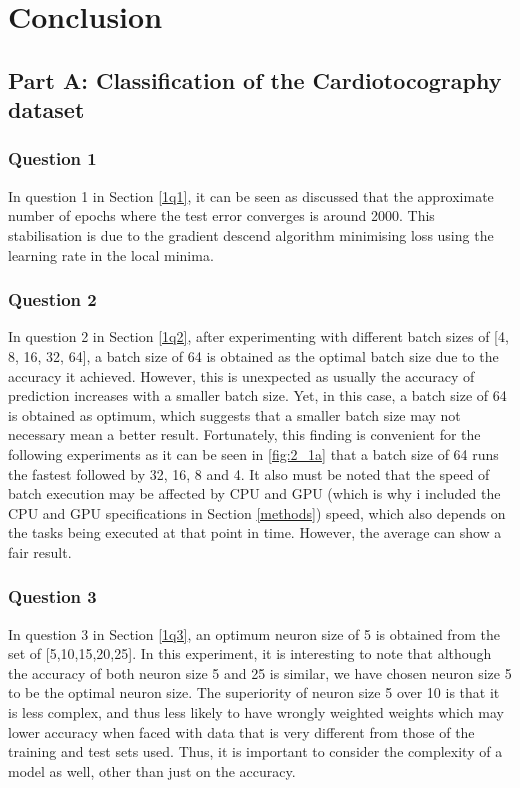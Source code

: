 \chapter{Conclusion}
\label{conclusion}

\section{Part A: Classification of the Cardiotocography dataset}
\subsection{Question 1}
In question 1 in Section \ref{1q1}, it can be seen as discussed that the approximate number of epochs where the test error converges is around 2000. This stabilisation is due to the gradient descend algorithm  minimising loss using the learning rate in the local minima.

\subsection{Question 2}
In question 2 in Section \ref{1q2}, after experimenting with different batch sizes of [4, 8, 16, 32, 64], a batch size of 64 is obtained as the optimal batch size due to the accuracy it achieved. However, this is unexpected as usually the accuracy of prediction increases with a smaller batch size. Yet, in this case, a batch size of 64 is obtained as optimum, which suggests that a smaller batch size may not necessary mean a better result. Fortunately, this finding is convenient for the following experiments as it can be seen in \ref{fig:2_1a} that a batch size of 64 runs the fastest followed by 32, 16, 8 and 4. It also must be noted that the speed of batch execution may be affected by CPU and GPU (which is why i included the CPU and GPU specifications in Section \ref{methods}) speed, which also depends on the tasks being executed at that point in time. However, the average can show a fair result.

\subsection{Question 3}
In question 3 in Section \ref{1q3}, an optimum neuron size of 5 is obtained from the set of [5,10,15,20,25]. In this experiment, it is interesting to note that although the accuracy of both neuron size 5 and 25 is similar, we have chosen neuron size 5 to be the optimal neuron size. The superiority of neuron size 5 over 10 is that it is less complex, and thus less likely to have wrongly weighted weights which may lower accuracy when faced with data that is very different from those of the training and test sets used. Thus, it is important to consider the complexity of a model as well, other than just on the accuracy.

